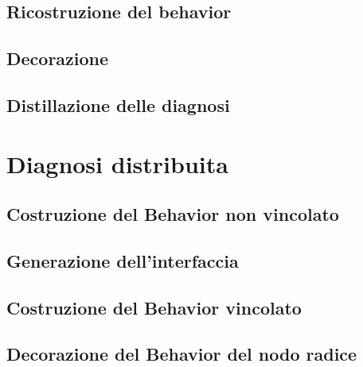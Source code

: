 \subsection{Ricostruzione del behavior}

\subsection{Decorazione}

\subsection{Distillazione delle diagnosi}


\section{Diagnosi distribuita}
\subsection{Costruzione del Behavior non vincolato}

\subsection{Generazione dell'interfaccia}

\subsection{Costruzione del Behavior vincolato}

\subsection{Decorazione del Behavior del nodo radice}